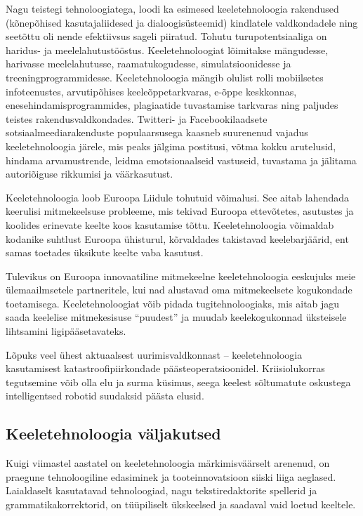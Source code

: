 \begin{multicols}{2}
Nagu teistegi tehnoloogiatega, loodi ka esimesed keeletehnoloogia rakendused (kõnepõhised kasutajaliidesed ja dia\-loogi\-süsteemid) kindlatele valdkondadele ning seetõttu oli nende efektiivsus sageli pii\-ratud.  Tohutu turupotentsiaaliga on haridus- ja meelelahutustööstus.  Keele\-tehnoloogiat lõimitakse mängudesse, harivasse meelelahutusse, raamatukogudesse, simulatsioonidesse ja treeningprogrammidesse.  Keeletehnoloogia mängib olulist rolli mobiilsetes infoteenustes, arvutipõhises keele\-õppetarkvaras, e-õppe keskkonnas, enese\-hindamisprogrammides, plagiaatide tuvastamise tarkvaras ning paljudes teistes rakendusvaldkondades.  Twitteri- ja Facebookilaadsete sotsiaalmeediarakenduste populaarsusega kaasneb suurenenud vajadus keeletehnoloogia järele, mis peaks jälgima postitusi, võtma kokku arutelusid, hindama arvamustrende, leidma emotsionaalseid vastuseid, tuvastama ja jälitama autoriõiguse rikkumisi ja väärkasutust.

Keeletehnoloogia loob Euroopa Liidule tohutuid võimalusi.  See aitab lahendada keerulisi mitmekeelsuse probleeme, mis tekivad Euroopa ettevõtetes, asutustes ja koolides erinevate keelte koos kasutamise tõttu.  Keeletehnoloogia võimaldab kodanike suhtlust Euroopa ühisturul, kõrvaldades takistavad keelebarjäärid, ent samas toetades üksikute keelte vaba kasutust.


Tulevikus on Euroopa innovaatiline mitmekeelne keeletehnoloogia eeskujuks meie ülemaailmsetele partneritele, kui nad alustavad oma mitmekeelsete kogukondade toetamisega. Keeletehnoloogiat võib pidada tugitehnoloogiaks, mis aitab jagu saada keelelise mitmekesisuse ``puu\-dest'' ja muudab keelekogukonnad üksteisele lihtsamini ligipääsetavateks.

Lõpuks veel ühest aktuaalsest uurimis\-vald\-konnast -- keeletehnoloogia kasutamisest katastroofipiirkondade pääste\-operatsioonidel.  Kriisiolukorras tegutsemine võib olla elu ja surma küsimus, seega keelest sõltumatute oskustega intelligentsed robotid suudaksid päästa elusid.

\subsection{Keeletehnoloogia väljakutsed}

Kuigi viimastel aastatel on keeletehno\-loogia märkimisväärselt arenenud, on praegune tehnoloogiline edasiminek ja tooteinnovatsioon siiski liiga aeglased. 
Laial\-daselt kasutatavad tehnoloogiad, nagu tekstiredaktorite spellerid ja grammatika\-korrektorid, on tüüpiliselt ükskeelsed ja saadaval vaid loetud keeltele. 


\end{multicols}
